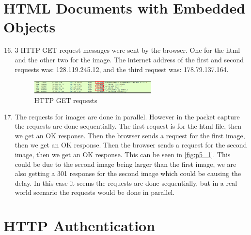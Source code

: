\documentclass{article}
\begin{document}
\section{HTML Documents with Embedded Objects}

\begin{enumerate}
    \setcounter{enumi}{15}
    \item 3 HTTP GET request messages were sent by the browser. One for the html and the other two for the image. The internet address of the first and second requests was: 128.119.245.12, and the third request was: 178.79.137.164.
    \begin{figure}[ht!]
        \centering
        \includegraphics[width=0.6\textwidth]{p5_1}
        \caption{HTTP GET requests}
        \label{fig:p5_1}
    \end{figure}
    \item The requests for images are done in parallel. However in the packet capture the requests are done sequentially. The first request is for the html file, then we get an OK response. Then the browser sends a request for the first image, then we get an OK response. Then the browser sends a request for the second image, then we get an OK response. This can be seen in \autoref{fig:p5_1}. This could be due to the second image being larger than the first image, we are also getting a 301 response for the second image which could be causing the delay. In this case it seems the requests are done sequentially, but in a real world scenario the requests would be done in parallel.
\end{enumerate}

\section{HTTP Authentication}
\end{document}

